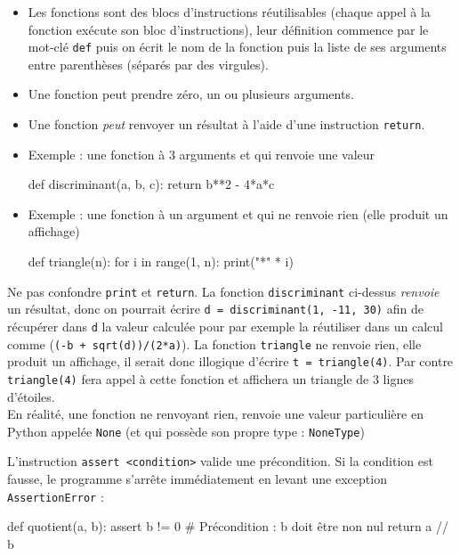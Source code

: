 \documentclass[11pt,a4paper]{article}
\begin{document}
\begin{tcolorbox}[left=0cm,title=\bf{\faPython \; Fonctions},colbacktitle=cfond]
\begin{itemize}
\item[\textbullet] Les fonctions sont des blocs d'instructions réutilisables (chaque appel à la fonction exécute son bloc d'instructions), leur définition commence par le mot-clé {\tt def} puis on écrit le nom de la fonction puis la liste de ses arguments entre parenthèses (séparés par des virgules).
\item[\textbullet] Une fonction peut prendre zéro, un ou plusieurs arguments.
\item[\textbullet] Une fonction \textit{peut} renvoyer un résultat à l'aide d'une instruction {\tt return}.
\item[\textbullet] Exemple : une fonction à 3 arguments et qui renvoie une valeur 
\begin{python}
def discriminant(a, b, c):
	return b**2 - 4*a*c
\end{python}
\item[\textbullet] Exemple : une fonction à un argument et qui ne renvoie rien (elle produit un affichage)
\begin{python}
def triangle(n):
	for i in range(1, n):
		print("*" * i) 
\end{python}
\end{itemize}
{\small \danger} Ne pas confondre {\tt print} et {\tt return}. La fonction {\tt discriminant} ci-dessus \textit{renvoie} un résultat, donc on pourrait écrire {\tt d = discriminant(1, -11, 30)} afin de récupérer dans {\tt d} la valeur calculée pour par exemple la réutiliser dans un calcul comme ({\tt (-b + sqrt(d))/(2*a)}). La fonction {\tt triangle} ne renvoie rien, elle produit un affichage, il serait donc illogique d'écrire {\tt t = triangle(4)}. Par contre {\tt triangle(4)} fera appel à cette fonction et affichera un triangle de 3 lignes d'étoiles.\\
{\small \danger} En réalité, une fonction ne renvoyant rien, renvoie une valeur particulière en Python appelée {\tt None} (et qui possède son propre type : {\tt NoneType})
\end{tcolorbox}

\begin{tcolorbox}[left=0cm,title=\bf{\faPython \; Spécification et assertions},colbacktitle=cfond]
L'instruction \texttt{assert <condition>} valide une précondition. Si la condition est fausse, le programme s'arrête immédiatement en levant une exception \texttt{AssertionError} :
\begin{python}
def quotient(a, b):
	assert b != 0 # Précondition : b doit être non nul
	return a // b
\end{python}
\end{tcolorbox}
\end{document}
